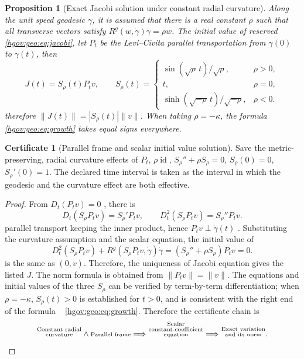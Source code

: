 \documentclass[12pt,a4paper,openany,notitlepage]{report}
\theoremstyle{plain}
\newtheorem{proposition}[theorem]{Proposition}
\theoremstyle{definition}
\newtheorem*{certificate}{Certificate}
\theoremstyle{remark}
\begin{document}
\begin{CJK*}
\begin{proposition}
[Exact Jacobi solution under constant radial curvature]\label{exp:geo:prop:constant-jacobi}
Along the unit speed geodesic $\gamma$, it is assumed that there is a real constant $\rho$ such that all transverse vectors satisfy $R^g(w,\dot\gamma)\dot\gamma=\rho w$. The initial value of reserved ~ \eqref{hgov:geo:eq:jacobi}, let $P_t$ be the Levi--Civita parallel transportation from $\gamma(0)$ to $\gamma(t)$, then \[
J(t)=S_\rho(t)P_tv,
\qquad
S_\rho(t)=
\begin{cases}
\sin(\sqrt\rho\,t)/\sqrt\rho,&\rho>0,\\
t,&\rho=0,\\
\sinh(\sqrt{-\rho}\,t)/\sqrt{-\rho},&\rho<0.
\end{cases}
\] therefore $\lVert J(t)\rVert=|S_\rho(t)|\lVert v\rVert$. When taking $\rho=-\kappa$, the formula ~ \eqref{hgov:geo:eq:growth} takes equal signs everywhere.\end{proposition}
\begin{certificate}
[Parallel frame and scalar initial value solution]Save the metric-preserving, radial curvature effects of $P_t$, $\rho\operatorname{id}$, $S_\rho''+\rho S_\rho=0$, $S_\rho(0)=0$, $S_\rho'(0)=1$. The declared time interval is taken as the interval in which the geodesic and the curvature effect are both effective.\end{certificate}
\begin{proof}
From $D_t(P_tv)=0$ , there is \[
D_t(S_\rho P_tv)=S_\rho'P_tv,
\qquad
D_t^2(S_\rho P_tv)=S_\rho''P_tv.
\] parallel transport keeping the inner product, hence $P_tv\perp\dot\gamma(t)$ . Substituting the curvature assumption and the scalar equation, the initial value of \[
D_t^2(S_\rho P_tv)+R^g(S_\rho P_tv,\dot\gamma)\dot\gamma
=(S_\rho''+\rho S_\rho)P_tv=0.
\] is the same as $(0,v)$. Therefore, the uniqueness of Jacobi equation gives the listed $J$. The norm formula is obtained from $\lVert P_tv\rVert=\lVert v\rVert$. The equations and initial values of the three $S_\rho$ can be verified by term-by-term differentiation; when $\rho=-\kappa$, $S_\rho(t)>0$ is established for $t>0$, and is consistent with the right end of the formula ~ \eqref{hgov:geo:eq:growth}. Therefore the certificate chain is \[
\text{\shortstack[c]{\scriptsize Constant radial\\[-1pt]\scriptsize curvature}}\land\text{\shortstack[c]{\scriptsize Parallel frame}}
\Longrightarrow\text{\shortstack[c]{\scriptsize Scalar\\[-1pt]\scriptsize constant-coefficient\\[-1pt]\scriptsize equation}}
\Longrightarrow\text{\shortstack[c]{\scriptsize Exact variation\\[-1pt]\scriptsize and its norm}}.
\]\end{proof}



\end{CJK*}
\end{document}
